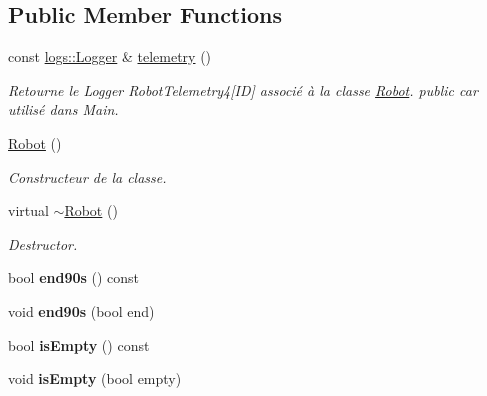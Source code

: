 \subsection*{Public Member Functions}
\begin{DoxyCompactItemize}
\item 
\mbox{\label{classRobot_aefc159a05956e09edbe5e75333db25a8}} 
const \hyperlink{classlogs_1_1Logger}{logs\+::\+Logger} \& \hyperlink{classRobot_aefc159a05956e09edbe5e75333db25a8}{telemetry} ()
\begin{DoxyCompactList}\small\item\em Retourne le Logger Robot\+Telemetry4\mbox{[}ID\mbox{]} associé à la classe \hyperlink{classRobot}{Robot}. public car utilisé dans Main. \end{DoxyCompactList}\item 
\mbox{\label{classRobot_a4fc7c70ae20623f05e06f2ecb388b6c4}} 
\hyperlink{classRobot_a4fc7c70ae20623f05e06f2ecb388b6c4}{Robot} ()
\begin{DoxyCompactList}\small\item\em Constructeur de la classe. \end{DoxyCompactList}\item 
\mbox{\label{classRobot_a924320124b09c2f2ac1621aa210d5f38}} 
virtual \hyperlink{classRobot_a924320124b09c2f2ac1621aa210d5f38}{$\sim$\+Robot} ()
\begin{DoxyCompactList}\small\item\em Destructor. \end{DoxyCompactList}\item 
\mbox{\label{classRobot_a99941a42e5ca4ffdc98c814e3161ca07}} 
bool {\bfseries end90s} () const
\item 
\mbox{\label{classRobot_ac5f6f099c36fec313247093b50975828}} 
void {\bfseries end90s} (bool end)
\item 
\mbox{\label{classRobot_a082495b8fff35165b750cd1cc5b48b90}} 
bool {\bfseries is\+Empty} () const
\item 
\mbox{\label{classRobot_a3dc113c69a3241bcb96cb8d45d4d2613}} 
void {\bfseries is\+Empty} (bool empty)
\item 

\end{DoxyCompactItemize}
